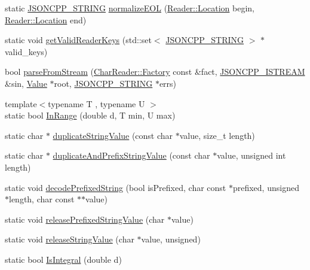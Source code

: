 \begin{DoxyCompactItemize}
\item 
static \hyperlink{json_8h_a1e723f95759de062585bc4a8fd3fa4be}{J\+S\+O\+N\+C\+P\+P\+\_\+\+S\+T\+R\+I\+NG} \hyperlink{namespace_json_a63123f3dd63f340ac517a59f44ea7aa4}{normalize\+E\+OL} (\hyperlink{class_json_1_1_reader_a46795b5b272bf79a7730e406cb96375a}{Reader\+::\+Location} begin, \hyperlink{class_json_1_1_reader_a46795b5b272bf79a7730e406cb96375a}{Reader\+::\+Location} end)
\item 
static void \hyperlink{namespace_json_a8c38450840f3d88e9b981ae132f7ad0a}{get\+Valid\+Reader\+Keys} (std\+::set$<$ \hyperlink{json_8h_a1e723f95759de062585bc4a8fd3fa4be}{J\+S\+O\+N\+C\+P\+P\+\_\+\+S\+T\+R\+I\+NG} $>$ $\ast$valid\+\_\+keys)
\item 
bool \hyperlink{namespace_json_a38f903cfdb57a6c4e86a7dcc42f3712c}{parse\+From\+Stream} (\hyperlink{class_json_1_1_char_reader_1_1_factory}{Char\+Reader\+::\+Factory} const \&fact, \hyperlink{json_8h_a15f2f70b2ce0a2abd0f8112393dbc4de}{J\+S\+O\+N\+C\+P\+P\+\_\+\+I\+S\+T\+R\+E\+AM} \&sin, \hyperlink{class_json_1_1_value}{Value} $\ast$root, \hyperlink{json_8h_a1e723f95759de062585bc4a8fd3fa4be}{J\+S\+O\+N\+C\+P\+P\+\_\+\+S\+T\+R\+I\+NG} $\ast$errs)
\item 
{\footnotesize template$<$typename T , typename U $>$ }\\static bool \hyperlink{namespace_json_aff0180507262a244de61b961178d7443}{In\+Range} (double d, T min, U max)
\item 
static char $\ast$ \hyperlink{namespace_json_a678ac3a60cd70ec0fb4c9abfd40eb0c4}{duplicate\+String\+Value} (const char $\ast$value, size\+\_\+t length)
\item 
static char $\ast$ \hyperlink{namespace_json_a9795a09a0141d1f12d307c4386aeaee6}{duplicate\+And\+Prefix\+String\+Value} (const char $\ast$value, unsigned int length)
\item 
static void \hyperlink{namespace_json_aad8b4982c1acd164f541fba396ac9fb1}{decode\+Prefixed\+String} (bool is\+Prefixed, char const $\ast$prefixed, unsigned $\ast$length, char const $\ast$$\ast$value)
\item 
static void \hyperlink{namespace_json_a48f4e3ea655e3b4a5d7f892c81f00511}{release\+Prefixed\+String\+Value} (char $\ast$value)
\item 
static void \hyperlink{namespace_json_a3e0d81d514d0e8bddf33b08074214abd}{release\+String\+Value} (char $\ast$value, unsigned)
\item 
static bool \hyperlink{namespace_json_a1a04cc9d31e64b5912dade003c9b99b5}{Is\+Integral} (double d)
$$
\end{DoxyCompactItemize}
